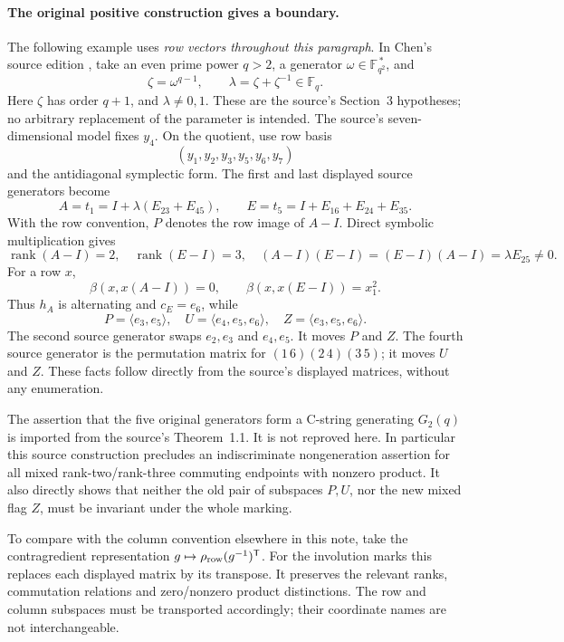 \documentclass[11pt]{article}
\begin{document}
\paragraph{The original positive construction gives a boundary.}
The following example uses \emph{row vectors throughout this paragraph}.
In Chen's source edition \cite{Chen}, take an even prime power \(q>2\),
a generator \(\omega\in\mathbb F_{q^2}^{\,*}\), and
\[
  \zeta=\omega^{q-1},\qquad \lambda=\zeta+\zeta^{-1}\in\mathbb F_q.
\]
Here \(\zeta\) has order \(q+1\), and \(\lambda\ne0,1\).
These are the source's Section~3 hypotheses; no arbitrary replacement
of the parameter is intended.
The source's seven-dimensional model fixes \(y_4\).
On the quotient, use row basis
\[
                   (y_1,y_2,y_3,y_5,y_6,y_7)
\]
and the antidiagonal symplectic form.
The first and last displayed source generators become
\[
 A=t_1=I+\lambda(E_{23}+E_{45}),\qquad
 E=t_5=I+E_{16}+E_{24}+E_{35}.                        \tag{13}
\]
With the row convention, \(P\) denotes the row image of \(A-I\).
Direct symbolic multiplication gives
\[
  \operatorname{rank}(A-I)=2,\quad
  \operatorname{rank}(E-I)=3,\quad
  (A-I)(E-I)=(E-I)(A-I)=\lambda E_{25}\ne0.
\]
For a row \(x\),
\[
 \beta(x,x(A-I))=0,\qquad \beta(x,x(E-I))=x_1^2.
\]
Thus \(h_A\) is alternating and \(c_E=e_6\), while
\[
 P=\langle e_3,e_5\rangle,\quad
 U=\langle e_4,e_5,e_6\rangle,\quad
 Z=\langle e_3,e_5,e_6\rangle.
\]
The second source generator swaps \(e_2,e_3\) and \(e_4,e_5\).
It moves \(P\) and \(Z\).
The fourth source generator is the permutation matrix for
\((1\,6)(2\,4)(3\,5)\); it moves \(U\) and \(Z\).
These facts follow directly from the source's displayed matrices,
without any enumeration.

The assertion that the five original generators form a C-string
generating \(G_2(q)\) is imported from the source's Theorem~1.1.
It is not reproved here. In particular this source construction
precludes an indiscriminate nongeneration assertion for all mixed
rank-two/rank-three commuting endpoints with nonzero product.
It also directly shows that neither the old pair of subspaces
\(P,U\), nor the new mixed flag \(Z\), must be invariant under
the whole marking.

To compare with the column convention elsewhere in this note,
take the contragredient representation
\(g\mapsto \rho_{\rm row}(g^{-1})^{\mathsf T}\).
For the involution marks this replaces each displayed matrix by
its transpose. It preserves the relevant ranks, commutation
relations and zero/nonzero product distinctions.
The row and column subspaces must be transported accordingly;
their coordinate names are not interchangeable.
\end{document}

